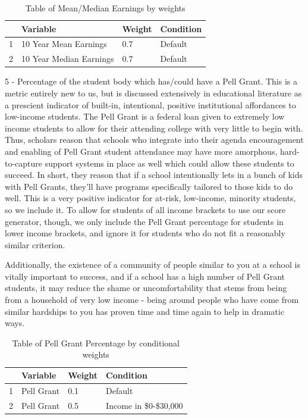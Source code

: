 \documentclass{article}\usepackage[]{graphicx}\usepackage[]{color}
\begin{document}
\begin{table}[ht]
\centering
\begin{tabular}{rlll}
  \hline
 & Variable & Weight & Condition \\ 
  \hline
1 & 10 Year Mean Earnings & 0.7 & Default \\ 
  2 & 10 Year Median Earnings & 0.7 & Default \\ 
   \hline
\end{tabular}
\caption{Table of Mean/Median Earnings by weights} 
\end{table}


5 - Percentage of the student body which has/could have a Pell Grant. This is a metric entirely new to us, but is discussed extensively in educational literature as a prescient indicator of built-in, intentional, positive institutional affordances to low-income students. The Pell Grant is a federal loan given to extremely low income students to allow for their attending college with very little to begin with. Thus, scholars reason that schools who integrate into their agenda encouragement and enabling of Pell Grant student attendance may have more amorphous, hard-to-capture support systems in place as well which could allow these students to succeed. In short, they reason that if a school intentionally lets in a bunch of kids with Pell Grants, they'll have programs specifically tailored to those kids to do well. This is a very positive indicator for at-risk, low-income, minority students, so we include it. To allow for students of all income brackets to use our score generator, though, we only include the Pell Grant percentage for students in lower income brackets, and ignore it for students who do not fit a reasonably similar criterion. \newline

Additionally, the existence of a community of people similar to you at a school is vitally important to success, and if a school has a high number of Pell Grant students, it may reduce the shame or uncomfortability that stems from being from a household of very low income - being around people who have come from similar hardships to you has proven time and time again to help in dramatic ways.  

\begin{table}[ht]
\centering
\begin{tabular}{rlll}
  \hline
 & Variable & Weight & Condition \\ 
  \hline
1 & Pell Grant & 0.1 & Default \\ 
  2 & Pell Grant & 0.5 & Income in \$0-\$30,000 \\ 
   \hline
\end{tabular}
\caption{Table of Pell Grant Percentage by conditional weights} 
\end{table}
\end{document}
